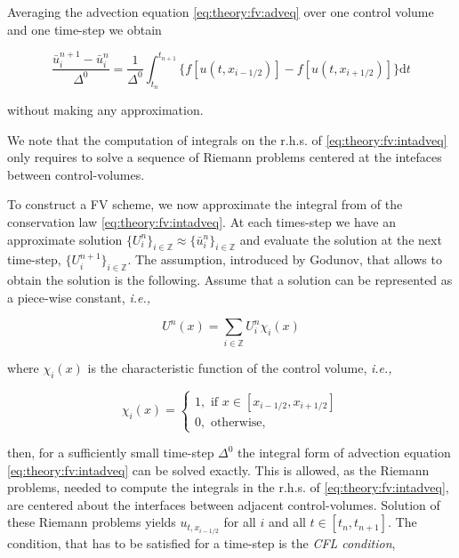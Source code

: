 Averaging the advection equation \ref{eq:theory:fv:adveq} over one control volume and one time-step we obtain

\begin{equation}
\frac{\bar{u}_{i}^{n+1}-\bar{u}_{i}^{n}}{\Delta^0} = \frac{1}{\Delta^0}\int_{t_n}^{t_{n+1}}\big\{f[u(t,x_{i-1/2})] - f[u(t,x_{i+1/2})]\big\}\text{d}t
\label{eq:theory:fv:intadveq}
\end{equation}

without making any approximation. 

We note that the computation of integrals on the r.h.s. of \ref{eq:theory:fv:intadveq} only requires to solve a sequence of Riemann problems centered at the intefaces between control-volumes. 

To construct a FV scheme, we now approximate the integral from of the conservation law \ref{eq:theory:fv:intadveq}. 
At each times-step we have an approximate solution $\{U_{i}^{n}\}_{i\in\mathbb{Z}} \approx \{\bar{u}_{i}^{n}\}_{i\in\mathbb{Z}}$ and evaluate the solution at the next time-step, $\{U_{i}^{n+1}\}_{i\in\mathbb{Z}}$. 
The assumption, introduced by Godunov, that allows to obtain the solution is the following. 
Assume that a solution can be represented as a piece-wise constant, \textit{i.e.,}

\begin{equation}
U^n(x) = \sum_{i\in\mathbb{Z}}U_i ^n \chi_i (x)
\end{equation}

where $\chi_i(x)$ is the characteristic function of the control volume, \textit{i.e.,}

\begin{equation}
\chi_i(x) = 
\begin{cases}
1, \text{ if } x\in[x_{i-1/2},x_{i+1/2}] \\
0, \text{ otherwise, }
\end{cases}
\end{equation}

then, for a sufficiently small time-step $\Delta^0$ the integral form of advection equation \ref{eq:theory:fv:intadveq} can be solved exactly. 
This is allowed, as the Riemann problems, needed to compute the integrals in the r.h.s. of \ref{eq:theory:fv:intadveq}, are centered about the interfaces between adjacent control-volumes. 
Solution of these Riemann problems yields $u_{t, x_{i-1/2}}$ for all $i$ and all $t\in[t_n, t_{n+1}]$. 
The condition, that has to be satisfied for a time-step is the \textit{CFL condition}, 

